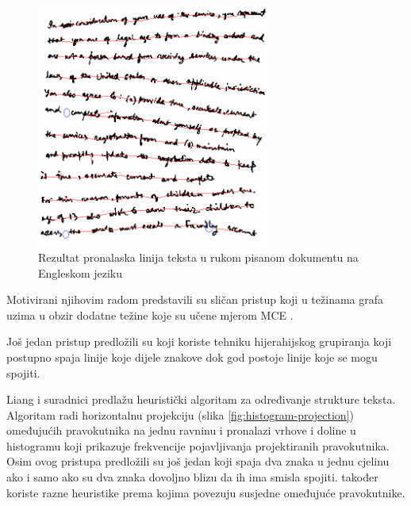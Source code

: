 \documentclass[times, utf8, zavrsni]{fer}
\begin{document}
\begin{figure}[htb]
    \centering
    \captionsetup{justification=centering,margin=2cm}
    \includegraphics[height=8cm]{images/mst-example-01.png}
    \caption{
        Rezultat pronalaska linija teksta u rukom pisanom dokumentu na
        Engleskom jeziku \citep{yin2007handwritten}
    }
    \label{fig:mst-example-01}
\end{figure}

Motivirani njihovim radom \citep{pan2011hybrid} predstavili su sličan pristup
koji u težinama grafa uzima u obzir dodatne težine koje su učene mjerom MCE
.

Još jedan pristup predložili su \citep{DBLP:journals/corr/abs-1301-2628} koji
koriste tehniku hijerahijskog grupiranja koji postupno spaja linije koje dijele
znakove dok god postoje linije koje se mogu spojiti.
\citep{DBLP:journals/corr/TianPHLYT16}

Liang i suradnici \citep{liang1996document} predlažu heuristički algoritam za
određivanje strukture teksta. Algoritam radi horizontalnu projekciju (slika
\ref{fig:histogram-projection}) omeđujućih pravokutnika na jednu ravninu i
pronalazi vrhove i doline u histogramu koji prikazuje frekvencije pojavljivanja
projektiranih pravokutnika. Osim ovog pristupa predložili su još jedan koji
spaja dva znaka u jednu cjelinu ako i samo ako su dva znaka dovoljno blizu da
ih ima smisla spojiti. \citep{gupta2006document} također
koriste razne heuristike prema kojima povezuju susjedne omeđujuće pravokutnike.
\end{document}
